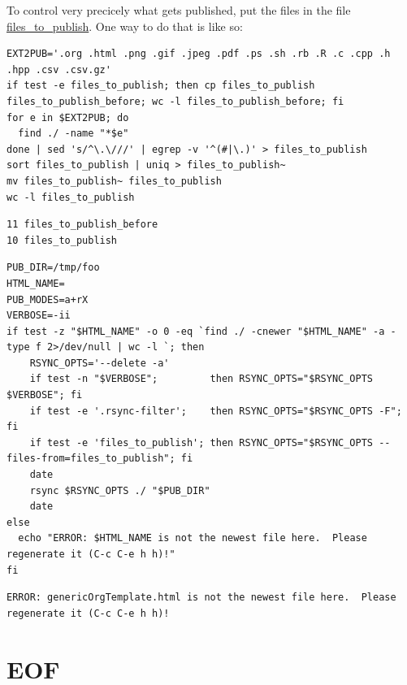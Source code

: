 \documentclass[11pt]{article}
\begin{document}
To control very precicely what gets published, put the files in the file \url{files\_to\_publish}.  One way to do that is like so:

\begin{verbatim}
EXT2PUB='.org .html .png .gif .jpeg .pdf .ps .sh .rb .R .c .cpp .h .hpp .csv .csv.gz'
if test -e files_to_publish; then cp files_to_publish files_to_publish_before; wc -l files_to_publish_before; fi
for e in $EXT2PUB; do
  find ./ -name "*$e"
done | sed 's/^\.\///' | egrep -v '^(#|\.)' > files_to_publish
sort files_to_publish | uniq > files_to_publish~
mv files_to_publish~ files_to_publish
wc -l files_to_publish
\end{verbatim}

\begin{verbatim}
11 files_to_publish_before
10 files_to_publish
\end{verbatim}

\begin{verbatim}
PUB_DIR=/tmp/foo
HTML_NAME=
PUB_MODES=a+rX
VERBOSE=-ii
if test -z "$HTML_NAME" -o 0 -eq `find ./ -cnewer "$HTML_NAME" -a -type f 2>/dev/null | wc -l `; then
    RSYNC_OPTS='--delete -a'
    if test -n "$VERBOSE";         then RSYNC_OPTS="$RSYNC_OPTS $VERBOSE"; fi
    if test -e '.rsync-filter';    then RSYNC_OPTS="$RSYNC_OPTS -F"; fi
    if test -e 'files_to_publish'; then RSYNC_OPTS="$RSYNC_OPTS --files-from=files_to_publish"; fi
    date
    rsync $RSYNC_OPTS ./ "$PUB_DIR"
    date
else
  echo "ERROR: $HTML_NAME is not the newest file here.  Please regenerate it (C-c C-e h h)!"
fi
\end{verbatim}

\begin{verbatim}
ERROR: genericOrgTemplate.html is not the newest file here.  Please regenerate it (C-c C-e h h)!
\end{verbatim}

\section{EOF}
\label{sec:orgf646f41}
\end{document}
